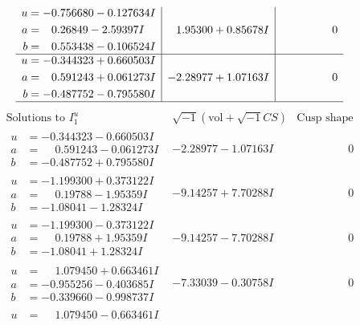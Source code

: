 \documentclass[1p]{elsarticle_modified}
\theoremstyle{definition}
\newcommand{\I}{\sqrt{-1}}
\begin{document}
$$\begin{array}{c|c|c}
\begin{aligned}
u &= -0.756680 - 0.127634 I \\
a &= \phantom{-}0.26849 - 2.59397 I \\
b &= \phantom{-}0.553438 - 0.106524 I\end{aligned}
 & \phantom{-}1.95300 + 0.85678 I & \phantom{-0.000000 } 0 \\ \hline\begin{aligned}
u &= -0.344323 + 0.660503 I \\
a &= \phantom{-}0.591243 + 0.061273 I \\
b &= -0.487752 - 0.795580 I\end{aligned}
 & -2.28977 + 1.07163 I & \phantom{-0.000000 } 0\\
 \hline 
 \end{array}$$\newpage$$\begin{array}{c|c|c}  
\text{Solutions to }I^u_{1}& \I (\text{vol} + \sqrt{-1}CS) & \text{Cusp shape}\\
 \hline 
\begin{aligned}
u &= -0.344323 - 0.660503 I \\
a &= \phantom{-}0.591243 - 0.061273 I \\
b &= -0.487752 + 0.795580 I\end{aligned}
 & -2.28977 - 1.07163 I & \phantom{-0.000000 } 0 \\ \hline\begin{aligned}
u &= -1.199300 + 0.373122 I \\
a &= \phantom{-}0.19788 - 1.95359 I \\
b &= -1.08041 - 1.28324 I\end{aligned}
 & -9.14257 + 7.70288 I & \phantom{-0.000000 } 0 \\ \hline\begin{aligned}
u &= -1.199300 - 0.373122 I \\
a &= \phantom{-}0.19788 + 1.95359 I \\
b &= -1.08041 + 1.28324 I\end{aligned}
 & -9.14257 - 7.70288 I & \phantom{-0.000000 } 0 \\ \hline\begin{aligned}
u &= \phantom{-}1.079450 + 0.663461 I \\
a &= -0.955256 - 0.403685 I \\
b &= -0.339660 - 0.998737 I\end{aligned}
 & -7.33039 - 0.30758 I & \phantom{-0.000000 } 0 \\ \hline\begin{aligned}
u &= \phantom{-}1.079450 - 0.663461 I \\

\end{aligned}
\end{array}$$
\end{document}
